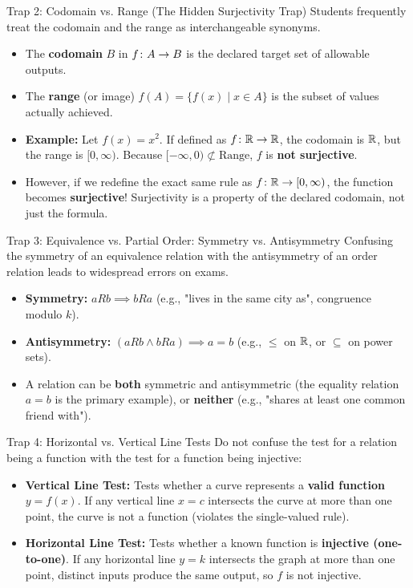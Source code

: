 \begin{trapbox}{Trap 2: Codomain vs. Range (The Hidden Surjectivity Trap)}
Students frequently treat the codomain and the range as interchangeable synonyms.
\begin{itemize}
    \item The \textbf{codomain} $B$ in $f \colon A \to B$ is the declared target set of allowable outputs.
    \item The \textbf{range} (or image) $f(A) = \{f(x) \mid x \in A\}$ is the subset of values actually achieved.
    \item \textbf{Example:} Let $f(x) = x^2$. If defined as $f \colon \mathbb{R} \to \mathbb{R}$, the codomain is $\mathbb{R}$, but the range is $[0, \infty)$. Because $[- \infty, 0) \not\subset \text{Range}$, $f$ is \textbf{not surjective}. 
    \item However, if we redefine the exact same rule as $f \colon \mathbb{R} \to [0, \infty)$, the function becomes \textbf{surjective}! Surjectivity is a property of the declared codomain, not just the formula.
\end{itemize}
\end{trapbox}

\begin{trapbox}{Trap 3: Equivalence vs. Partial Order: Symmetry vs. Antisymmetry}
Confusing the symmetry of an equivalence relation with the antisymmetry of an order relation leads to widespread errors on exams.
\begin{itemize}
    \item \textbf{Symmetry:} $a R b \implies b R a$ (e.g., "lives in the same city as", congruence modulo $k$).
    \item \textbf{Antisymmetry:} $(a R b \land b R a) \implies a = b$ (e.g., $\le$ on $\mathbb{R}$, or $\subseteq$ on power sets).
    \item A relation can be \textbf{both} symmetric and antisymmetric (the equality relation $a = b$ is the primary example), or \textbf{neither} (e.g., "shares at least one common friend with").
\end{itemize}
\end{trapbox}

\begin{trapbox}{Trap 4: Horizontal vs. Vertical Line Tests}
Do not confuse the test for a relation being a function with the test for a function being injective:
\begin{itemize}
    \item \textbf{Vertical Line Test:} Tests whether a curve represents a \textbf{valid function} $y = f(x)$. If any vertical line $x = c$ intersects the curve at more than one point, the curve is not a function (violates the single-valued rule).
    \item \textbf{Horizontal Line Test:} Tests whether a known function is \textbf{injective (one-to-one)}. If any horizontal line $y = k$ intersects the graph at more than one point, distinct inputs produce the same output, so $f$ is not injective.
\end{itemize}
\end{trapbox}

